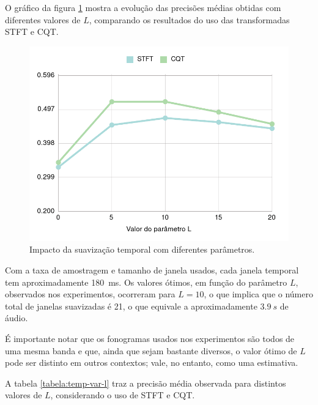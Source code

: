         O gráfico da figura \ref{fig:exp:suav-temporal} mostra a evolução das precisões médias obtidas com diferentes valores de $L$, comparando os resultados do uso das transformadas STFT e CQT.
        
        \begin{figure}[h]
            \begin{center}
                \includegraphics[width=13cm]{figuras/04-stft-e-cqt-bin-suavizacao-temporal.png}
                \caption{\label{fig:exp:suav-temporal}Impacto da suavização temporal com diferentes parâmetros.}
            \end{center}
        \end{figure}
        
        Com a taxa de amostragem e tamanho de janela usados, cada janela temporal tem aproximadamente 180~ms. Os valores ótimos, em função do parâmetro $L$, observados nos experimentos, ocorreram para $L = 10$, o que implica que o número total de janelas suavizadas é 21, o que equivale a aproximadamente ${3.9}~s$ de áudio.
        
        É importante notar que os fonogramas usados nos experimentos são todos de uma mesma banda e que, ainda que sejam bastante diversos, o valor ótimo de $L$ pode ser distinto em outros contextos; vale, no entanto, como uma estimativa.
        
        A tabela \ref{tabela:temp-var-l} traz a precisão média observada para distintos valores de $L$, considerando o uso de STFT e CQT.

